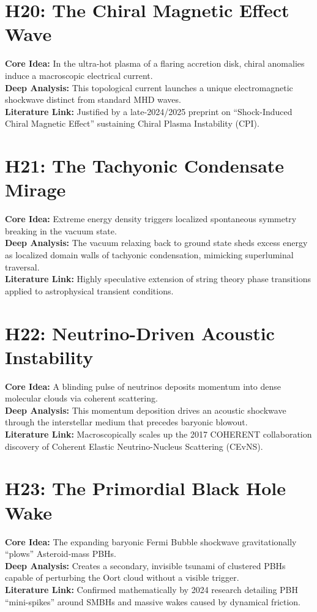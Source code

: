 \documentclass{article}
\begin{document}
\section*{H20: The Chiral Magnetic Effect Wave}
\textbf{Core Idea:} In the ultra-hot plasma of a flaring accretion disk, chiral anomalies induce a macroscopic electrical current. \\
\textbf{Deep Analysis:} This topological current launches a unique electromagnetic shockwave distinct from standard MHD waves. \\
\textbf{Literature Link:} Justified by a late-2024/2025 preprint on ``Shock-Induced Chiral Magnetic Effect'' sustaining Chiral Plasma Instability (CPI).

\section*{H21: The Tachyonic Condensate Mirage}
\textbf{Core Idea:} Extreme energy density triggers localized spontaneous symmetry breaking in the vacuum state. \\
\textbf{Deep Analysis:} The vacuum relaxing back to ground state sheds excess energy as localized domain walls of tachyonic condensation, mimicking superluminal traversal. \\
\textbf{Literature Link:} Highly speculative extension of string theory phase transitions applied to astrophysical transient conditions.

\section*{H22: Neutrino-Driven Acoustic Instability}
\textbf{Core Idea:} A blinding pulse of neutrinos deposits momentum into dense molecular clouds via coherent scattering. \\
\textbf{Deep Analysis:} This momentum deposition drives an acoustic shockwave through the interstellar medium that precedes baryonic blowout. \\
\textbf{Literature Link:} Macroscopically scales up the 2017 COHERENT collaboration discovery of Coherent Elastic Neutrino-Nucleus Scattering (CEvNS).

\section*{H23: The Primordial Black Hole Wake}
\textbf{Core Idea:} The expanding baryonic Fermi Bubble shockwave gravitationally ``plows'' Asteroid-mass PBHs. \\
\textbf{Deep Analysis:} Creates a secondary, invisible tsunami of clustered PBHs capable of perturbing the Oort cloud without a visible trigger. \\
\textbf{Literature Link:} Confirmed mathematically by 2024 research detailing PBH ``mini-spikes'' around SMBHs and massive wakes caused by dynamical friction.
\end{document}
